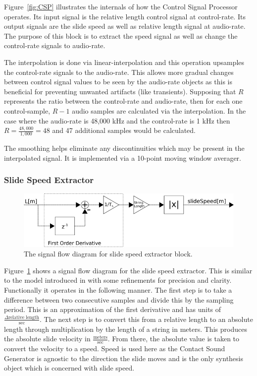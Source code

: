 \documentclass[../main.tex]{subfiles}
\begin{document}
Figure~\ref{fig:CSP} illustrates the internals of how the Control Signal Processor operates. Its input signal is the relative length control signal at control-rate. Its output signals are the slide speed as well as relative length signal at audio-rate. The purpose of this block is to extract the speed signal as well as change the control-rate signals to audio-rate.

The interpolation is done via linear-interpolation and this operation upsamples the control-rate signals to the audio-rate. This allows more gradual changes between control signal values to be seen by the audio-rate objects as this is beneficial for preventing unwanted artifacts (like transients). Supposing that $R$ represents the ratio between the control-rate and audio-rate, then for each one control-sample, $R-1$ audio samples are calculated via the interpolation. In the case where the audio-rate is 48,000 kHz and the control-rate is 1 kHz then $R = \frac{48,000}{1,000} = 48$ and 47 additional samples would be calculated.

The smoothing helps eliminate any discontinuities which may be present in the interpolated signal. It is implemented via a 10-point moving window averager.

\subsubsection{Slide Speed Extractor}

\begin{figure}[h]
    \centering
    \includegraphics[scale=.5]{./images/diagrams/slideSpeedExtractor.png}
    \caption{The signal flow diagram for slide speed extractor block.}
    \label{fig:SSE}
\end{figure}

Figure~\ref{fig:SSE} shows a signal flow diagram for the slide speed extractor. This is similar to the model introduced in  with some refinements for precision and clarity. Functionally it operates in the following manner. The first step is to take a difference between two consecutive samples and divide this by the sampling period. This is an approximation of the first derivative and has units of $\frac{\Delta \text{relative length}}{\text{sec}}$. The next step is to convert this from a relative length to an absolute length through multiplication by the length of a string in meters. This produces the absolute slide velocity in $\frac{\text{meters}}{\text{sec}}$. From there, the absolute value is taken to convert the velocity to a speed. Speed is used here as the Contact Sound Generator is agnostic to the direction the slide moves and is the only synthesis object which is concerned with slide speed.
\end{document}
